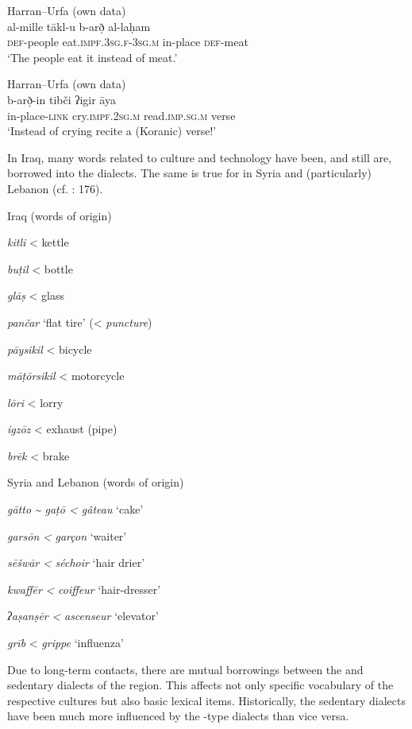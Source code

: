 \documentclass[output=paper]{langsci/langscibook}
\begin{document}
\ea
{Harran--Urfa (own data)}\\
 \gll   al-mille tākl-u b-arð̣ al-laḥam\\
     \textsc{def}{}-people eat.\textsc{impf.3sg.f-3sg.m}  in-place \textsc{def}{}-meat\\
\glt  ‘The people eat it instead of meat.’
\z

\ea 
{Harran--Urfa (own data)}\\
\gll    b-arð̣-in tibči ʔigir āya\\
     in-place-\textsc{link} cry.\textsc{impf.2sg.m} read.\textsc{imp.sg.m} verse\\
\glt ‘Instead of crying recite a (Koranic) verse!’
\z

In Iraq, many  words related to  culture and technology have been, and still are, borrowed into the dialects. The same is true for  in Syria and (particularly) Lebanon (cf. \citealt{Barbot1961}: 176).

\ea
Iraq (words of  origin)

\textit{kitli} < kettle 

\textit{buṭil} < bottle

\textit{glāṣ} < glass

\textit{pančar} ‘flat tire’ (< \textit{puncture})

\textit{pāysikil} < bicycle

\textit{māṭōrsikil} < motorcycle

\textit{lōri} < lorry 

\textit{igzōz} < exhaust (pipe)

\textit{brēk} < brake
\z

\ea
Syria and Lebanon (words of  origin)

\textit{gātto} \textit{{\textasciitilde} gaṭō < gâteau} ‘cake’

\textit{garsōn} \textit{<} \textit{garçon} ‘waiter’

\textit{sēšwār} \textit{<} \textit{séchoir} ‘hair drier’

\textit{kwaffēr} \textit{<} \textit{coiffeur} ‘hair-dresser’

\textit{ʔaṣanṣēr} \textit{<} \textit{ascenseur} ‘elevator’

\textit{grīb} < \textit{grippe} ‘influenza’
\z

Due to long-term contacts, there are mutual borrowings between the  and sedentary dialects of the region. This affects not only specific vocabulary of the respective cultures but also basic lexical items. Historically, the sedentary dialects have been much more influenced by the -type dialects than vice versa. 
\end{document}

